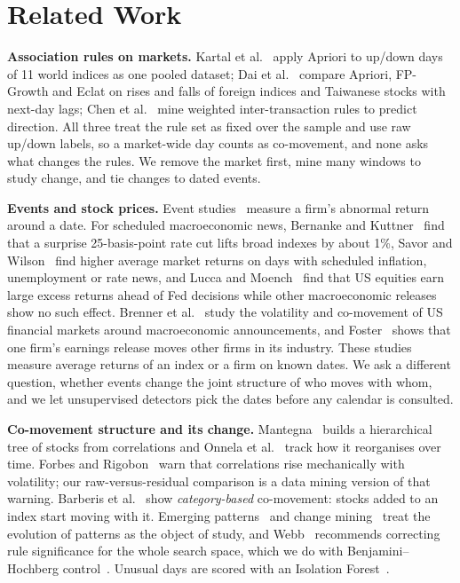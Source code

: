 \documentclass[conference]{IEEEtran}
\begin{document}
\section{Related Work}
\textbf{Association rules on markets.} Kartal et al.~\cite{kartal2022} apply Apriori to up/down days of 11 world indices as one pooled dataset; Dai et al.~\cite{dai2024} compare Apriori, FP-Growth and Eclat on rises and falls of foreign indices and Taiwanese stocks with next-day lags; Chen et al.~\cite{chen2022} mine weighted inter-transaction rules to predict direction. All three treat the rule set as fixed over the sample and use raw up/down labels, so a market-wide day counts as co-movement, and none asks what changes the rules. We remove the market first, mine many windows to study change, and tie changes to dated events.

\textbf{Events and stock prices.} Event studies~\cite{mackinlay1997} measure a firm's abnormal return around a date. For scheduled macroeconomic news, Bernanke and Kuttner~\cite{bernanke2005} find that a surprise 25-basis-point rate cut lifts broad indexes by about 1\%, Savor and Wilson~\cite{savor2013} find higher average market returns on days with scheduled inflation, unemployment or rate news, and Lucca and Moench~\cite{lucca2015} find that US equities earn large excess returns ahead of Fed decisions while other macroeconomic releases show no such effect. Brenner et al.~\cite{brenner2009} study the volatility and co-movement of US financial markets around macroeconomic announcements, and Foster~\cite{foster1981} shows that one firm's earnings release moves other firms in its industry. These studies measure average returns of an index or a firm on known dates. We ask a different question, whether events change the joint structure of who moves with whom, and we let unsupervised detectors pick the dates before any calendar is consulted.

\textbf{Co-movement structure and its change.} Mantegna~\cite{mantegna1999} builds a hierarchical tree of stocks from correlations and Onnela et al.~\cite{onnela2003} track how it reorganises over time. Forbes and Rigobon~\cite{forbes2002} warn that correlations rise mechanically with volatility; our raw-versus-residual comparison is a data mining version of that warning. Barberis et al.~\cite{barberis2005} show \emph{category-based} co-movement: stocks added to an index start moving with it. Emerging patterns~\cite{dong1999} and change mining~\cite{bottcher2008} treat the evolution of patterns as the object of study, and Webb~\cite{webb2007} recommends correcting rule significance for the whole search space, which we do with Benjamini--Hochberg control~\cite{benjamini1995}. Unusual days are scored with an Isolation Forest~\cite{liu2008}.
\end{document}
